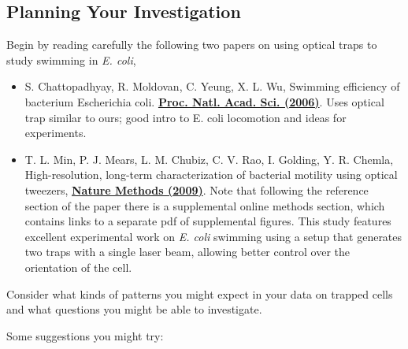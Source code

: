 \documentclass{../lab}
\begin{document}
\subsection{Planning Your Investigation}

Begin by reading carefully the following two papers on using optical traps to study swimming in \emph{E. coli},

\begin{itemize}
    \item S. Chattopadhyay, R. Moldovan, C. Yeung, X. L. Wu, Swimming efficiency of bacterium Escherichia coli. \href{http://physics111.lib.berkeley.edu/Physics111/Reprints/OTZ/swimmingefficiency.pdf}{\textbf{Proc. Natl. Acad. Sci. (2006)}}. Uses optical trap similar to ours; good intro to E. coli locomotion and ideas for experiments.

    \item T. L. Min, P. J. Mears, L. M. Chubiz, C. V. Rao, I. Golding, Y. R. Chemla, High-resolution, long-term characterization of bacterial motility using optical tweezers, \href{http://physics111.lib.berkeley.edu/Physics111/Reprints/OTZ/bacterialmotility.pdf}{\textbf{Nature Methods (2009)}}. Note that following the reference section of the paper there is a supplemental online methods section, which contains links to a separate pdf of supplemental figures. This study features excellent experimental work on \emph{E. coli} swimming using a setup that generates two traps with a single laser beam, allowing better control over the orientation of the cell.
\end{itemize}

Consider what kinds of patterns you might expect in your data on trapped cells and what questions you might be able to investigate.

Some suggestions you might try:
\end{document}
